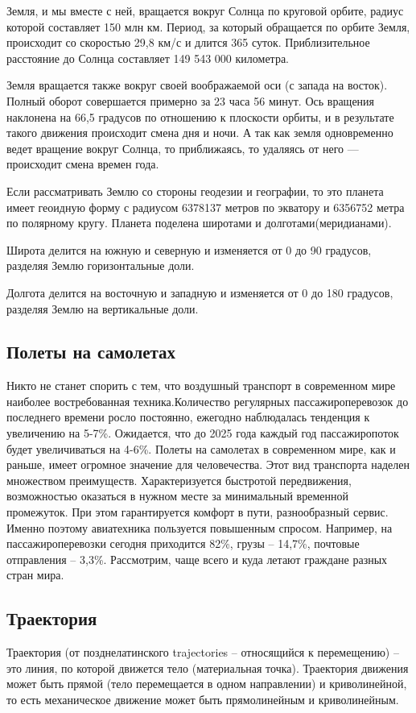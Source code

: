 \documentclass[14pt, a4paper]{extarticle}
\begin{document}
	Земля, и мы вместе с ней, вращается вокруг Солнца по круговой орбите, радиус которой составляет 150 млн км. Период, за который обращается по орбите Земля, происходит со скоростью 29,8 км/с и длится 365 суток. Приблизительное расстояние до Солнца составляет 149 543 000 километра.\par
	
	Земля вращается также вокруг своей воображаемой оси (с запада на восток). Полный оборот совершается примерно за 23 часа 56 минут. Ось вращения наклонена на
	66,5 градусов по отношению к плоскости орбиты, и в результате такого движения происходит смена дня и ночи. А так как земля одновременно ведет вращение вокруг Солнца, то приближаясь, то удаляясь от него — происходит смена времен года.\par
	
	
	Если рассматривать Землю со стороны геодезии и географии, то это планета имеет геоидную форму с радиусом 6378137 метров по экватору и 6356752 метра по полярному кругу. Планета поделена широтами и долготами(меридианами).\par
	Широта делится на южную и северную и изменяется от 0 до 90 градусов, разделяя Землю горизонтальные доли.\par
	Долгота делится на восточную и западную и изменяется от 0 до 180 градусов, разделяя Землю на вертикальные доли.

	\subsection{Полеты на самолетах}
	Никто не станет спорить с тем, что воздушный транспорт в современном мире наиболее востребованная техника.Количество регулярных пассажироперевозок до последнего времени росло постоянно, ежегодно наблюдалась тенденция к увеличению на 5-7\%. Ожидается, что до 2025 года каждый год пассажиропоток будет увеличиваться на 4-6\%.	
	Полеты на самолетах в современном мире, как и раньше, имеет огромное значение для человечества. Этот вид транспорта наделен множеством преимуществ. Характеризуется быстротой передвижения, возможностью оказаться в нужном месте за минимальный временной промежуток. При этом гарантируется комфорт в пути, разнообразный сервис. Именно поэтому авиатехника пользуется повышенным спросом. Например, на пассажироперевозки сегодня приходится 82\%, грузы – 14,7\%, почтовые отправления – 3,3\%. Рассмотрим, чаще всего и куда летают граждане разных стран мира.
	
	
	
	\subsection{Траектория}
	Траектория (от позднелатинского trajectories – относящийся к перемещению) – это линия, по которой движется тело (материальная точка). Траектория движения может быть прямой (тело перемещается в одном направлении) и криволинейной, то есть механическое движение может быть прямолинейным и криволинейным.\par
	
\end{document}
